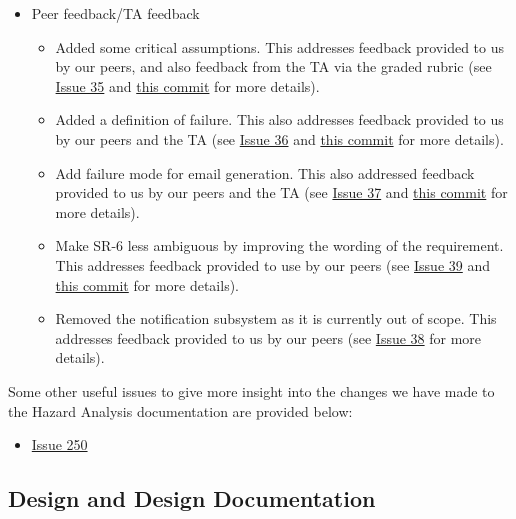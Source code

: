 \documentclass{article}
\begin{document}
\begin{itemize}
    \item Peer feedback/TA feedback
          \begin{itemize}
              \item Added some critical assumptions. This addresses feedback provided to us by our peers, and also feedback from the TA via the graded rubric (see \href{https://github.com/davimang/REACH/issues/35}{Issue 35} and \href{https://github.com/davimang/REACH/commit/643f128b7c4bd9c3072f56c813d5551e18c0af4e}{this commit} for more details).
              \item Added a definition of failure. This also addresses feedback provided to us by our peers and the TA (see \href{https://github.com/davimang/REACH/issues/36}{Issue 36} and \href{https://github.com/davimang/REACH/commit/3909aa4b28693cec5cc4ef3a9d7b84c41a6ffb24}{this commit} for more details).
              \item Add failure mode for email generation. This also addressed feedback provided to us by our peers and the TA (see \href{https://github.com/davimang/REACH/issues/36}{Issue 37} and \href{https://github.com/davimang/REACH/commit/e39f11a5c2fe7af0b6e261a353f818e2780ac43d}{this commit} for more details).
              \item Make SR-6 less ambiguous by improving the wording of the requirement. This addresses feedback provided to use by our peers (see \href{https://github.com/davimang/REACH/issues/39}{Issue 39} and \href{https://github.com/davimang/REACH/commit/bb0701657d9f217275ee0027e30f728f8924e277}{this commit} for more details).
              \item Removed the notification subsystem as it is currently out of scope. This addresses feedback provided to us by our peers (see \href{https://github.com/davimang/REACH/issues/38}{Issue 38} for more details).
          \end{itemize}
\end{itemize}

Some other useful issues to give more insight into the changes we have made to the Hazard Analysis documentation are provided below:

\begin{itemize}
    \item \href{https://github.com/davimang/REACH/issues/250}{Issue 250}
\end{itemize}


\subsection{Design and Design Documentation}
\end{document}
